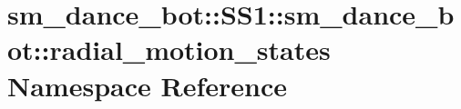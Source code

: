 \hypertarget{namespacesm__dance__bot_1_1SS1_1_1sm__dance__bot_1_1radial__motion__states}{}\section{sm\+\_\+dance\+\_\+bot\+:\+:S\+S1\+:\+:sm\+\_\+dance\+\_\+bot\+:\+:radial\+\_\+motion\+\_\+states Namespace Reference}
\label{namespacesm__dance__bot_1_1SS1_1_1sm__dance__bot_1_1radial__motion__states}
